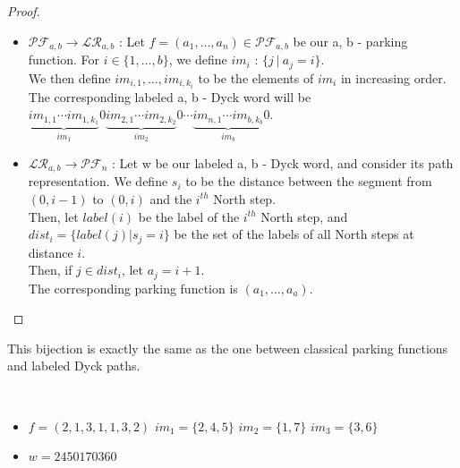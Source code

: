\begin{proof}
    ~\
    \begin{itemize}
        \item $\mathcal{PF}_{a,b} \to \mathcal{LR}_{a,b}$ :
        Let $f = (a_1, \ldots, a_n) \in \mathcal{PF}_{a,b}$
        be our a, b - parking function. For $i \in \{1, \ldots,
        b\}$, we define $im_i$ : $\{j\ |\ a_j = i\}$. \\
        We then define $im_{i,1}, \ldots, im_{i,k_i}$ to be
        the elements of $im_i$ in increasing order.\\
        The corresponding labeled a, b - Dyck word will be \\
        $\underbrace{im_{1,1} \cdots im_{1,k_1}}_{im_1}0
         \underbrace{im_{2,1} \cdots im_{2,k_2}}_{im_2}0
         \cdots
         \underbrace{im_{n,1} \cdots im_{b,k_b}}_{im_b}0$.

        \item $\mathcal{LR}_{a,b} \to \mathcal{PF}_n$ :
        Let w be our labeled a, b - Dyck word, and consider its
        path representation. We define $s_i$ to be the
        distance between the segment from $(0, i-1)$ to
        $(0,i)$ and the $i^{th}$ North step.\\
        Then, let $label(i)$ be the label of the $i^{th}$
        North step, and $dist_i = \{label(j) | s_j = i\}$
        be the set of the labels of all North steps at
        distance $i$.\\
        Then, if $j \in dist_i$, let $a_j = i + 1$.\\
        The corresponding parking function is
        $(a_1, \ldots, a_a)$.
    \end{itemize}
\end{proof}

\begin{rem}
    This bijection is exactly the same as the one between
    classical parking functions and labeled Dyck paths.
\end{rem}

\begin{example}[$a > b : a = 7, b = 3,
        \mathcal{PF}_{a,b} \to \mathcal{LR}_{a,b}$]
    ~\
    \begin{itemize}
        \item $f = (2, 1, 3, 1, 1, 3, 2)$
            \subitem $im_1 = \{2, 4, 5\}$
            \hspace{16mm} $im_2 = \{1, 7\}$
            \hspace{24mm} $im_3 = \{3, 6\}$
        \item $w = 2450170360$
    \end{itemize}
    
\end{example}

